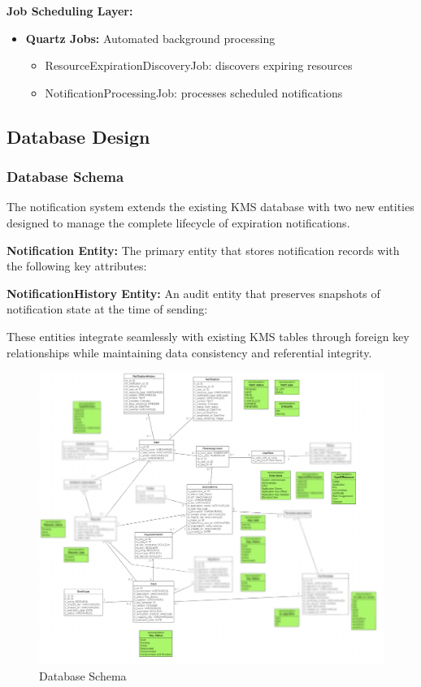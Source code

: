 \noindent
\textbf{Job Scheduling Layer:}
\begin{itemize}
    \item \textbf{Quartz Jobs:} Automated background processing
        \begin{itemize}
            \item ResourceExpirationDiscoveryJob: discovers expiring resources
            \item NotificationProcessingJob: processes scheduled notifications
        \end{itemize}
\end{itemize}

\subsection{Database Design}

\subsubsection{Database Schema}

The notification system extends the existing KMS database with two new entities designed to manage the complete lifecycle of expiration notifications.

\noindent
\textbf{Notification Entity:}
The primary entity that stores notification records with the following key attributes:

\noindent
\textbf{NotificationHistory Entity:}
An audit entity that preserves snapshots of notification state at the time of sending:

\noindent
These entities integrate seamlessly with existing KMS tables through foreign key relationships while maintaining data consistency and referential integrity.

\begin{figure}[H]
    \centering
    \includegraphics[width=1\textwidth]{images/database_schema.png}
    \caption{Database Schema}
    \label{fig:database_schema}
\end{figure}

